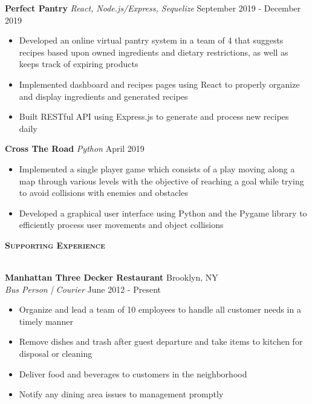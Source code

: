 \documentclass[a4paper]{article}
\newcommand{\lineunder} {
    \vspace*{-8pt} \\
    \hspace*{-18pt} \hrulefill \\
}
\newcommand{\header} [1] {
    {\hspace*{-18pt}\vspace*{6pt} \textsc{#1}}
    \vspace*{-6pt} \lineunder
}
\begin{document}
{\textbf{Perfect Pantry}} {\sl React, Node.js/Express, Sequelize} \hfill September 2019 - December 2019\\
\vspace{-3mm}
\begin{itemize} \itemsep -2pt
	\item Developed an online virtual pantry system in a team of 4 that suggests recipes based upon owned ingredients and dietary restrictions, as well as keeps track of expiring products
    \item Implemented dashboard and recipes pages using React to properly organize and display ingredients and generated recipes
    \item Built RESTful API using Express.js to generate and process new recipes daily
    \end{itemize}

{\textbf{Cross The Road}} {\sl Python} \hfill April 2019\\
\vspace{-3mm}
\begin{itemize} \itemsep -2pt
	\item Implemented a single player game which consists of a play moving along a map through various levels with the objective of reaching a goal while trying to avoid collisions with enemies and obstacles
    \item Developed a graphical user interface using Python and the Pygame library to efficiently process user movements and object collisions
    \end{itemize}


\header{\textbf{Supporting Experience}}
\vspace{1mm}

\textbf{Manhattan Three Decker Restaurant} \hfill Brooklyn, NY\\
\textit{Bus Person | Courier} \hfill June 2012 - Present\\
\vspace{-3mm}
\begin{itemize} \itemsep -3pt
	\item Organize and lead a team of 10 employees to handle all customer needs in a timely manner
	\item Remove dishes and trash after guest departure and take items to kitchen for disposal or cleaning
    \item Deliver food and beverages to customers in the neighborhood
    \item Notify any dining area issues to management promptly
\end{itemize}



\ 
\end{document}

